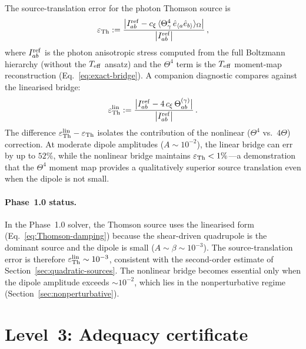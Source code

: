 The source-translation error for the photon Thomson source is
\begin{equation}\label{eq:err-Th}
\varepsilon_{\rm Th}
:= \frac{
  \big|
    I_{ab}^{\rm ref}
    - c_\xi\,
      \langle \Theta_\gamma^4\,
      \hat{e}_{\langle a}\hat{e}_{b\rangle}
      \rangle_\Omega
  \big|
}{
  \big| I_{ab}^{\rm ref} \big|
}\,,
\end{equation}
where $I_{ab}^{\rm ref}$ is the photon anisotropic stress
computed from the full Boltzmann hierarchy (without the
$T_{\mathrm{eff}}$ ansatz) and the $\Theta^4$ term is the $T_{\mathrm{eff}}$
moment-map reconstruction
(Eq.~\ref{eq:exact-bridge}).  A companion diagnostic
compares against the linearised bridge:
\begin{equation}\label{eq:err-Th-lin}
\varepsilon_{\rm Th}^{\rm lin}
:= \frac{
  \big|
    I_{ab}^{\rm ref}
    - 4\,c_\xi\,\Theta^{(\gamma)}_{ab}
  \big|
}{
  \big| I_{ab}^{\rm ref} \big|
}\,.
\end{equation}
The difference
$\varepsilon_{\rm Th}^{\rm lin} - \varepsilon_{\rm Th}$
isolates the contribution of the nonlinear ($\Theta^4$
vs.\ $4\Theta$) correction.  At moderate dipole amplitudes
($A \sim 10^{-2}$), the linear bridge can err by up to
$52\%$, while the nonlinear bridge maintains
$\varepsilon_{\rm Th} < 1\%$---a demonstration that the
$\Theta^4$ moment map provides a qualitatively superior
source translation even when the dipole is not small.


\paragraph{Phase~1.0 status.}

In the Phase~1.0 solver, the Thomson source uses the
linearised form (Eq.~\ref{eq:Thomson-damping}) because the
shear-driven quadrupole is the dominant source and the
dipole is small ($A \sim \beta \sim 10^{-3}$).  The
source-translation error is therefore
$\varepsilon_{\rm Th}^{\rm lin} \sim 10^{-3}$, consistent
with the second-order estimate of
Section~\ref{sec:quadratic-sources}.  The nonlinear bridge
becomes essential only when the dipole amplitude exceeds
$\sim\!10^{-2}$, which lies in the nonperturbative regime
(Section~\ref{sec:nonperturbative}).


\section{Level~3: Adequacy certificate}
\label{sec:err-adequacy}

